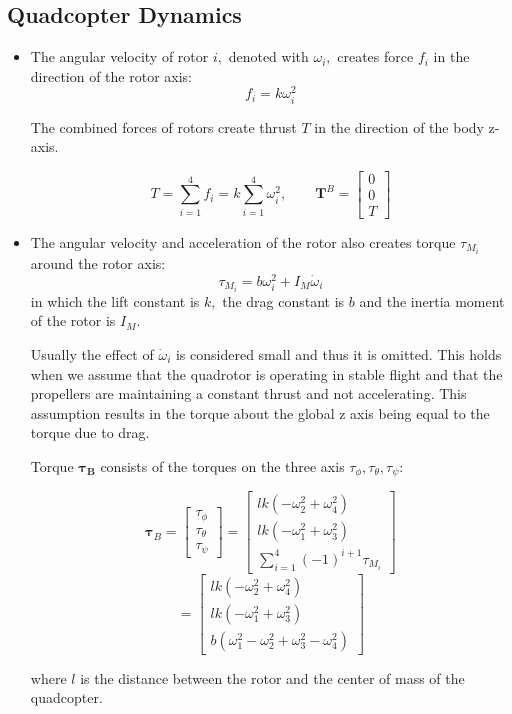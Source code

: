 \subsection{Quadcopter Dynamics}
\begin{itemize}
  \item The angular velocity of rotor $i,$ denoted with $\omega_{i},$ creates force $f_{i}$ in the direction of
the rotor axis: 
$$f_{i}=k \omega_{i}^{2}$$

The combined forces of rotors create thrust $T$ in the direction of the body z-axis.

$$T=\sum_{i=1}^{4} f_{i}=k \sum_{i=1}^{4} \omega_{i}^{2}, \quad \quad \boldsymbol{T}^{B}=\left[ \begin{array}{c}{0} \\ {0} \\ {T}\end{array}\right]$$

  \item The angular velocity and acceleration of the rotor also creates torque $\tau_{M_i}$ around the rotor axis: 
  $$\tau_{M_{i}}=b \omega_{i}^{2}+I_{M} \dot{\omega}_{i}$$
  in which the lift constant is $k,$ the drag constant is $b$ and the inertia moment of the
rotor is $I_{M}$. 

Usually the effect of $\dot{\omega}_{i}$ is considered small and thus it is omitted.
  This holds when we assume that the quadrotor is operating in stable flight and that the propellers are maintaining a constant thrust and not accelerating.
  This assumption results in the torque about the global z axis being equal to the torque due to drag.

Torque $\boldsymbol{\tau_B}$ consists of the torques on the three axis $\tau_\phi, \tau_\theta, \tau_\psi$:

$$
\boldsymbol{\tau}_{B}=\left[ \begin{array}{c}{\tau_{\phi}} \\ {\tau_{\theta}} \\ {\tau_{\psi}}\end{array}\right]=
\left[ \begin{array}{c}{l k\left(-\omega_{2}^{2}+\omega_{4}^{2}\right)} \\ {l k\left(-\omega_{1}^{2}+\omega_{3}^{2}\right)} \\ {\sum_{i=1}^{4} (-1)^{i+1} \tau_{M_{i}}}\end{array}\right]
  $$
  $$
  =
\left[ \begin{array}{c}
{l k\left(-\omega_{2}^{2}+\omega_{4}^{2}\right)} \\
{l k\left(-\omega_{1}^{2}+\omega_{3}^{2}\right)} \\
{b(\omega_{1}^{2}-\omega_{2}^{2}+\omega_{3}^{2}-\omega_{4}^{2})}\end{array}\right]
  $$

where $l$ is the distance between the rotor and the center of mass of the quadcopter.

\end{itemize}



